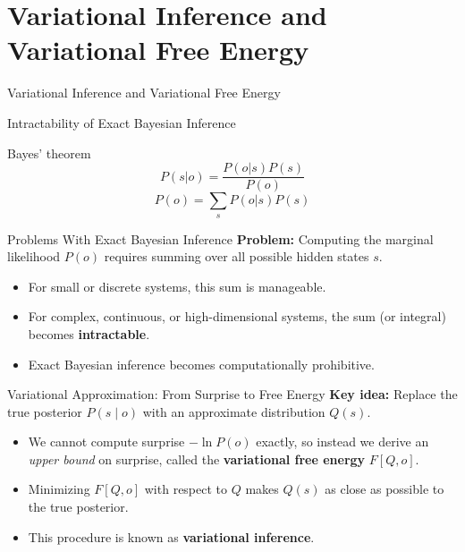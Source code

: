 \documentclass[aspectratio=1610, english]{beamer}
\begin{document}
\section{Variational Inference and Variational Free Energy}
\begin{frame}{Variational Inference and Variational Free Energy}
    \sectionpage
\end{frame}

\begin{frame}{Intractability of Exact Bayesian Inference}
    \begin{block}{Bayes' theorem}
        \begin{equation}
            P(s|o) = \frac{P(o|s)P(s)}{P(o)}
        \end{equation}
        \begin{equation}
            P(o) = \sum_{s}{P(o|s)P(s)}
        \end{equation}
    \end{block}
\end{frame}

\begin{frame}{Problems With Exact Bayesian Inference}
\textbf{Problem:}  
Computing the marginal likelihood \( P(o) \) requires summing over all possible hidden states \( s \).

\medskip

\begin{itemize}
    \item For small or discrete systems, this sum is manageable.
    \item For complex, continuous, or high-dimensional systems, the sum (or integral) becomes \textbf{intractable}.
    \item Exact Bayesian inference becomes computationally prohibitive.
\end{itemize}
\end{frame}

\begin{frame}{Variational Approximation: From Surprise to Free Energy}
\textbf{Key idea:} Replace the true posterior \(P(s\mid o)\) with an approximate distribution \(Q(s)\).  

\medskip

\begin{itemize}
  \item We cannot compute surprise \(-\ln P(o)\) exactly, so instead we derive an \emph{upper bound} on surprise, called the \textbf{variational free energy} \(F[Q,o]\).
  \item Minimizing \(F[Q,o]\) with respect to \(Q\) makes \(Q(s)\) as close as possible to the true posterior.
  \item This procedure is known as \textbf{variational inference}.
\end{itemize}
\end{frame}
\end{document}
